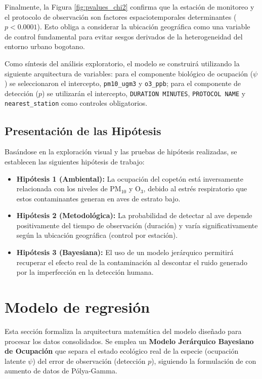 \documentclass[twocolumn,10pt]{article}
\begin{document}
Finalmente, la Figura \ref{fig:pvalues_chi2} confirma que la estación de monitoreo y el protocolo de observación son factores espaciotemporales determinantes ($p < 0.0001$). Esto obliga a considerar la ubicación geográfica como una variable de control fundamental para evitar sesgos derivados de la heterogeneidad del entorno urbano bogotano.

Como síntesis del análisis exploratorio, el modelo se construirá utilizando la siguiente arquitectura de variables: para el componente biológico de ocupación ($\psi$) se seleccionaron el intercepto, \texttt{pm10\_ugm3} y \texttt{o3\_ppb}; para el componente de detección ($p$) se utilizarán el intercepto, \texttt{DURATION MINUTES}, \texttt{PROTOCOL NAME} y \texttt{nearest\_station} como controles obligatorios.

\subsection{Presentación de las Hipótesis}

Basándose en la exploración visual y las pruebas de hipótesis realizadas, se establecen las siguientes hipótesis de trabajo:

\begin{itemize}
    \item \textbf{Hipótesis 1 (Ambiental):} La ocupación del copetón está inversamente relacionada con los niveles de $\text{PM}_{10}$ y $\text{O}_3$, debido al estrés respiratorio que estos contaminantes generan en aves de estrato bajo.
    \item \textbf{Hipótesis 2 (Metodológica):} La probabilidad de detectar al ave depende positivamente del tiempo de observación (duración) y varía significativamente según la ubicación geográfica (control por estación).
    \item \textbf{Hipótesis 3 (Bayesiana):} El uso de un modelo jerárquico permitirá recuperar el efecto real de la contaminación al descontar el ruido generado por la imperfección en la detección humana.
\end{itemize}

\section{Modelo de regresión}

\justifying
Esta sección formaliza la arquitectura matemática del modelo diseñado para procesar los datos consolidados. Se emplea un \textbf{Modelo Jerárquico Bayesiano de Ocupación} que separa el estado ecológico real de la especie (ocupación latente $\psi$) del error de observación (detección $p$), siguiendo la formulación de \cite{clark2019} con aumento de datos de Pólya-Gamma.
\end{document}
